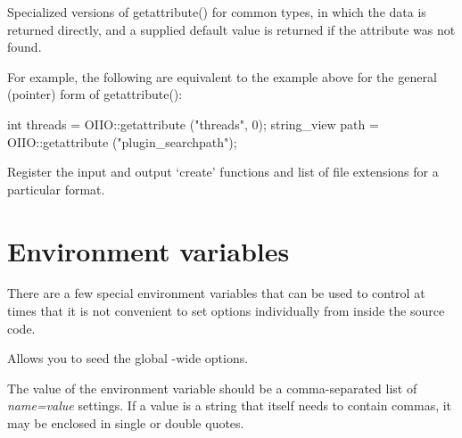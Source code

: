  
Specialized versions of {\cf getattribute()} for common types, in which the
data is returned directly, and a supplied default value is returned if the
attribute was not found.

For example, the following are equivalent to the example above for the
general (pointer) form of {\cf getattribute()}:

\begin{code}
      int threads = OIIO::getattribute ("threads", 0);
      string_view path = OIIO::getattribute ("plugin_searchpath");
\end{code}
\apiend


Register the input and output `create' functions and list of file extensions
for a particular format.
\apiend

\section{Environment variables}

There are a few special environment variables that can be used to control
\product at times that it is not convenient to set options individually from
inside the source code.

\NEW %
Allows you to seed the global \product-wide options.

The value of the environment variable should be a comma-separated list of
\emph{name=value} settings. If a value is a string that itself needs to
contain commas, it may be enclosed in single or double quotes.

